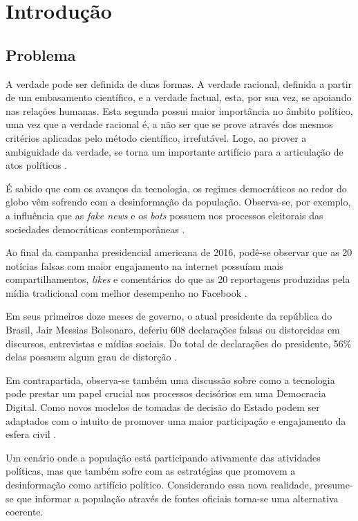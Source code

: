 \chapter{Introdução}
\label{introducao}

\section{Problema}
A verdade pode ser definida de duas formas. A verdade racional, definida a partir de um embasamento científico, e a verdade factual, esta, por sua vez, se apoiando nas relações humanas. Esta segunda possui maior importância no âmbito político, uma vez que a verdade racional é, a não ser que se prove através dos mesmos critérios aplicadas pelo método científico, irrefutável. Logo, ao prover a ambiguidade da verdade, se torna um importante artifício para a articulação de atos políticos \cite{entrepassadofuturo}.

É sabido que com os avanços da tecnologia, os regimes democráticos ao redor do globo vêm sofrendo com a desinformação da população. Observa-se, por exemplo, a influência que as \textit{fake news} e os \textit{bots} possuem nos processos eleitorais das sociedades democráticas contemporâneas \cite{fakenewsbot}.

Ao final da campanha presidencial americana de 2016, podê-se observar que as 20 notícias falsas com maior engajamento na internet possuíam mais compartilhamentos, \textit{likes} e comentários do que as 20 reportagens produzidas pela mídia tradicional com melhor desempenho no Facebook \cite{facebookamericananalysis}. 

Em seus primeiros doze meses de governo, o atual presidente da república do Brasil, Jair Messias Bolsonaro, deferiu 608 declarações falsas ou distorcidas em discursos, entrevistas e mídias sociais. Do total de declarações do presidente, 56\% delas possuem algum grau de distorção \cite{declaracoesbolsonaro}.

Em contrapartida, observa-se também uma discussão sobre como a tecnologia pode prestar um papel crucial nos processos decisórios em uma Democracia Digital. Como novos modelos de tomadas de decisão do Estado podem ser adaptados com o intuito de promover uma maior participação e engajamento da esfera civil \cite{democraciadigital}.

Um cenário onde a população está participando ativamente das atividades políticas, mas que também sofre com as estratégias que promovem a desinformação como artifício político. Considerando essa nova realidade, presume-se que informar a população através de fontes oficiais torna-se uma alternativa coerente.

